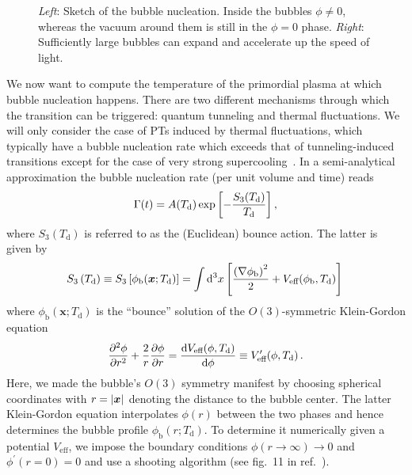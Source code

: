 \begin{figure}[t]
{
	} \quad
	\caption[]{\textit{Left}: Sketch of the bubble nucleation. Inside the bubbles $\phi \neq 0$, whereas the vacuum around them is still in the $\phi = 0$ phase. \textit{Right}: Sufficiently large bubbles can expand and accelerate up the speed of light.}
	\label{fig:bubbleexpansion}
\end{figure}

We now want to compute the temperature of the primordial plasma at which bubble nucleation happens. There are two different mechanisms through which the transition can be triggered: quantum tunneling and thermal fluctuations. We will only consider the case of \acp{PT} induced by thermal fluctuations, which typically have a bubble nucleation rate which exceeds that of tunneling-induced  transitions except for the case of very strong supercooling~\cite{Athron:2023xlk}. In a semi-analytical approximation the bubble nucleation rate (per unit volume and time) reads~\cite{Coleman:1977py, Linde:1980tt, Linde:1981zj}
\begin{align}
	\Gamma(t) = A(T_\text{d}) \exp \left[ -\frac{S_3(T_\text{d})}{T_\text{d}} \right], \label{eq:nuclrate}
\end{align}
where $S_3(T_\text{d})$ is referred to as the (Euclidean) bounce action. The latter is given by 
\begin{align}
	S_3\left( T_\text{d} \right) \equiv S_3\left[ \phi_\text{b}(\bm{x}; T_\text{d}) \right] =  \int \mathop{}\!\mathrm{d}^3 x \left[  \frac{\left( \nabla \phi_\text{b} \right)^2}{2} + V_\text{eff}(\phi_\text{b}, T_\text{d}) \right] \, 
\end{align}
where $\phi_\text{b}(\bm{x}; T_\text{d})$ is the ``bounce'' solution of the $O(3)$-symmetric Klein-Gordon equation
\begin{align}
	\frac{\partial^2 \phi}{\partial r^2} + \frac{2}{r} \frac{\partial \phi}{\partial r} = \frac{\mathrm d V_{\text{eff}}(\phi, T_\text{d}) }{\mathrm d \phi} \equiv V_{\text{eff}}^\prime(\phi, T_\text{d}) \, .
\end{align}
Here, we made the bubble's $O(3)$ symmetry manifest by choosing spherical coordinates with $r = \lvert\bm{x}\rvert$ denoting the distance to the bubble center. The latter Klein-Gordon equation interpolates $\phi(r)$ between the two phases and hence determines the bubble profile $\phi_\text{b}(r; T_\text{d})$. To determine it numerically given a potential $V_\text{eff}$, we impose the boundary conditions $\phi(r \rightarrow \infty )  \rightarrow 0$ and $\phi^\prime(r = 0) = 0$ and use a shooting algorithm (see fig.~11 in ref.~\cite{Athron:2023xlk}).

